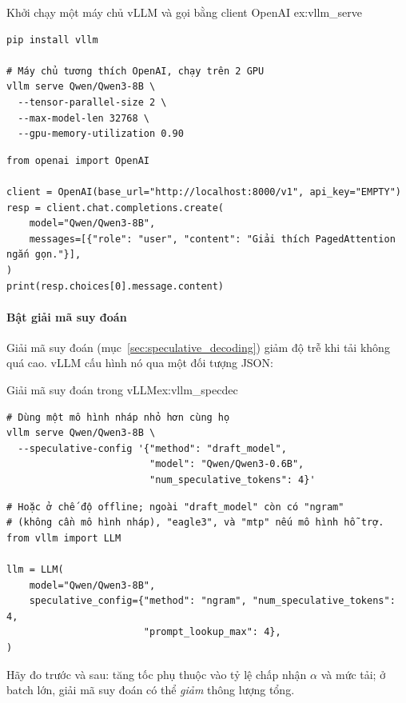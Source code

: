 \begin{example}{Khởi chạy một máy chủ vLLM và gọi bằng client OpenAI \newtag}{ex:vllm_serve}
\begin{verbatim}
pip install vllm

# Máy chủ tương thích OpenAI, chạy trên 2 GPU
vllm serve Qwen/Qwen3-8B \
  --tensor-parallel-size 2 \
  --max-model-len 32768 \
  --gpu-memory-utilization 0.90
\end{verbatim}
\begin{verbatim}
from openai import OpenAI

client = OpenAI(base_url="http://localhost:8000/v1", api_key="EMPTY")
resp = client.chat.completions.create(
    model="Qwen/Qwen3-8B",
    messages=[{"role": "user", "content": "Giải thích PagedAttention ngắn gọn."}],
)
print(resp.choices[0].message.content)
\end{verbatim}
\end{example}

\paragraph{Bật giải mã suy đoán \newtag}
Giải mã suy đoán (mục~\ref{sec:speculative_decoding}) giảm độ trễ khi tải không quá cao. vLLM cấu hình nó qua một đối tượng JSON:
\begin{example}{Giải mã suy đoán trong vLLM}{ex:vllm_specdec}
\begin{verbatim}
# Dùng một mô hình nháp nhỏ hơn cùng họ
vllm serve Qwen/Qwen3-8B \
  --speculative-config '{"method": "draft_model",
                         "model": "Qwen/Qwen3-0.6B",
                         "num_speculative_tokens": 4}'
\end{verbatim}
\begin{verbatim}
# Hoặc ở chế độ offline; ngoài "draft_model" còn có "ngram"
# (không cần mô hình nháp), "eagle3", và "mtp" nếu mô hình hỗ trợ.
from vllm import LLM

llm = LLM(
    model="Qwen/Qwen3-8B",
    speculative_config={"method": "ngram", "num_speculative_tokens": 4,
                        "prompt_lookup_max": 4},
)
\end{verbatim}
\end{example}
Hãy đo trước và sau: tăng tốc phụ thuộc vào tỷ lệ chấp nhận $\alpha$ và mức tải; ở batch lớn, giải mã suy đoán có thể \emph{giảm} thông lượng tổng.

